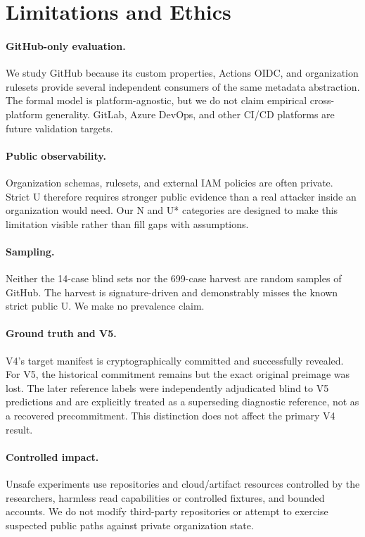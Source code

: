 \documentclass[sigconf,review,anonymous]{acmart}
\newcommand{\U}{\textsf{U}}
\newcommand{\N}{\textsf{N}}
\begin{document}
\section{Limitations and Ethics}

\paragraph{GitHub-only evaluation.}
We study GitHub because its custom properties, Actions OIDC, and organization
rulesets provide several independent consumers of the same metadata abstraction.
The formal model is platform-agnostic, but we do not claim empirical
cross-platform generality.  GitLab, Azure DevOps, and other CI/CD platforms are
future validation targets.

\paragraph{Public observability.}
Organization schemas, rulesets, and external IAM policies are often private.
Strict \U{} therefore requires stronger public evidence than a real attacker
inside an organization would need.  Our \N{} and U* categories are designed to
make this limitation visible rather than fill gaps with assumptions.

\paragraph{Sampling.}
Neither the 14-case blind sets nor the 699-case harvest are random samples of
GitHub.  The harvest is signature-driven and demonstrably misses the known
strict public \U{}.  We make no prevalence claim.

\paragraph{Ground truth and V5.}
V4's target manifest is cryptographically committed and successfully revealed.
For V5, the historical commitment remains but the exact original preimage was
lost.  The later reference labels were independently adjudicated blind to V5
predictions and are explicitly treated as a superseding diagnostic reference,
not as a recovered precommitment.  This distinction does not affect the primary
V4 result.

\paragraph{Controlled impact.}
Unsafe experiments use repositories and cloud/artifact resources controlled by
the researchers, harmless read capabilities or controlled fixtures, and
bounded accounts.  We do not modify third-party repositories or attempt to
exercise suspected public paths against private organization state.
\end{document}
